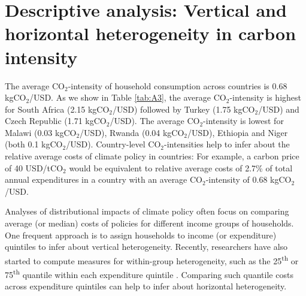 \documentclass[12pt, a4paper]{article}
\begin{document}
\section{Descriptive analysis: Vertical and horizontal heterogeneity in carbon intensity} \label{sec:descriptive}


The average CO$_{2}$-intensity of household consumption across countries is 0.68 kgCO$_{2}$/USD. As we show in Table \ref{tab:A3}, the average CO$_{2}$-intensity is highest for South Africa (2.15 kgCO$_{2}$/USD) followed by Turkey (1.75 kgCO$_{2}$/USD) and Czech Republic (1.71 kgCO$_{2}$/USD). The average CO$_{2}$-intensity is lowest for Malawi (0.03 kgCO$_{2}$/USD), Rwanda (0.04 kgCO$_{2}$/USD), Ethiopia and Niger (both 0.1 kgCO$_{2}$/USD). Country-level CO$_{2}$-intensities help to infer about the relative average costs of climate policy in countries: For example, a carbon price of 40 USD/tCO$_{2}$ \autocite{Stiglitz.2017} would be equivalent to relative average costs of 2.7\% of total annual expenditures in a country with an average CO$_{2}$-intensity of 0.68 kgCO$_{2}$/USD.



Analyses of distributional impacts of climate policy often focus on comparing average (or median) costs of policies for different income groups of households. One frequent approach is to assign households to income (or expenditure) quintiles to infer about vertical heterogeneity. Recently, researchers have also started to compute measures for within-group heterogeneity, such as the 25\textsuperscript{th} or 75\textsuperscript{th} quantile within each expenditure quintile \autocite{Cronin.2019, Missbach.2024}. Comparing such quantile costs across expenditure quintiles can help to infer about horizontal heterogeneity.
\end{document}

